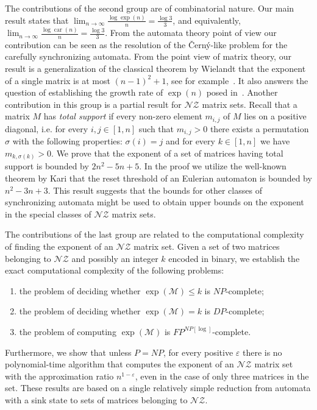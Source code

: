 \documentclass[a4paper,USenglish]{lipics}
\DeclareMathOperator{\car}{car}
\theoremstyle{definition}
\begin{document}
The contributions of the second group are of combinatorial nature. Our main result states that $\lim_{n\rightarrow\infty} \tfrac{\log \exp(n)}{n} = \tfrac{\log 3}{3}$, and equivalently, $\lim_{n\rightarrow\infty} \tfrac{\log \car(n)}{n} = \tfrac{\log 3}{3}$. From the automata theory point of view our contribution can be seen as the resolution of the \v{C}ern\'{y}-like problem for the carefully synchronizing automata. From the point view of matrix theory, our result is a generalization of the classical theorem by Wielandt that the exponent of a single matrix is at most $(n-1)^2 + 1$, see for example~\cite[Corollary 8.5.9]{HoJo}. It also answers the question of establishing the growth rate of $\exp(n)$ posed in~\cite{BJO15}. Another contribution in this group is a partial result for $\mathscr{NZ}$ matrix sets. Recall that a matrix $M$ has \emph{total support} if every non-zero element $m_{i,j}$ of $M$ lies on a positive diagonal, i.e. for every $i,j \in [1,n]$ such that $m_{i,j}>0$ there exists a permutation $\sigma$ with the following properties: $\sigma(i)=j$ and for every $k \in [1,n]$ we have $m_{k, \sigma (k)} > 0$. We prove that the exponent of a set of matrices having total support is bounded by $2n^2 -5n +5$. In the proof we  utilize the well-known theorem by Kari that the reset threshold of an Eulerian automaton is bounded by $n^2 -3n +3$. This result suggests that the bounds for other classes of synchronizing automata might be used to obtain upper bounds on the exponent in the special classes of $\mathscr{NZ}$ matrix sets.

The contributions of the last group are related to the computational complexity of finding the exponent of an $\mathscr{NZ}$ matrix set. Given a set of two matrices belonging to $\mathscr{NZ}$ and possibly an integer $k$ encoded in binary, we establish the exact computational complexity 	of the following problems:
\begin{enumerate}
\item the problem of deciding whether $\exp(\mathcal{M}) \leq k$ is $NP$-complete;
\item the problem of deciding whether $\exp(\mathcal{M}) = k$ is $DP$-complete;
\item the problem of computing $\exp(\mathcal{M})$ is $FP^{NP[\log]}$-complete.
\end{enumerate} 
Furthermore, we show that unless $P=NP$, for every positive $\varepsilon$ there is no polynomial-time algorithm that computes the exponent of an $\mathscr{NZ}$ matrix set with the approximation ratio $n^{1-\varepsilon}$, even in the case of only three matrices in the set. These results are based on a single relatively simple reduction from automata with a sink state to sets of matrices belonging to $\mathscr{NZ}$.
\end{document}

